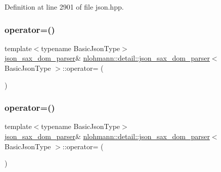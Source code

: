 Definition at line 2901 of file json.\+hpp.

\mbox{\label{classnlohmann_1_1detail_1_1json__sax__dom__parser_a98448bf2cbc15d15e2eddc5a09a40a42}} 
\subsubsection{\texorpdfstring{operator=()}{operator=()}\hspace{0.1cm}{\footnotesize\ttfamily [1/2]}}
{\footnotesize\ttfamily template$<$typename Basic\+Json\+Type$>$ \\
\mbox{\hyperlink{classnlohmann_1_1detail_1_1json__sax__dom__parser}{json\+\_\+sax\+\_\+dom\+\_\+parser}}\& \mbox{\hyperlink{classnlohmann_1_1detail_1_1json__sax__dom__parser}{nlohmann\+::detail\+::json\+\_\+sax\+\_\+dom\+\_\+parser}}$<$ Basic\+Json\+Type $>$\+::operator= (\begin{DoxyParamCaption}\item[{const \mbox{\hyperlink{classnlohmann_1_1detail_1_1json__sax__dom__parser}{json\+\_\+sax\+\_\+dom\+\_\+parser}}$<$ Basic\+Json\+Type $>$ \&}]{ }\end{DoxyParamCaption})\hspace{0.3cm}{\ttfamily [delete]}}

\mbox{\label{classnlohmann_1_1detail_1_1json__sax__dom__parser_aff928a07e40e4efb16b3ff9384f4401c}} 
\subsubsection{\texorpdfstring{operator=()}{operator=()}\hspace{0.1cm}{\footnotesize\ttfamily [2/2]}}
{\footnotesize\ttfamily template$<$typename Basic\+Json\+Type$>$ \\
\mbox{\hyperlink{classnlohmann_1_1detail_1_1json__sax__dom__parser}{json\+\_\+sax\+\_\+dom\+\_\+parser}}\& \mbox{\hyperlink{classnlohmann_1_1detail_1_1json__sax__dom__parser}{nlohmann\+::detail\+::json\+\_\+sax\+\_\+dom\+\_\+parser}}$<$ Basic\+Json\+Type $>$\+::operator= (\begin{DoxyParamCaption}\item[{\mbox{\hyperlink{classnlohmann_1_1detail_1_1json__sax__dom__parser}{json\+\_\+sax\+\_\+dom\+\_\+parser}}$<$ Basic\+Json\+Type $>$ \&\&}]{ }\end{DoxyParamCaption})\hspace{0.3cm}{\ttfamily [default]}}

